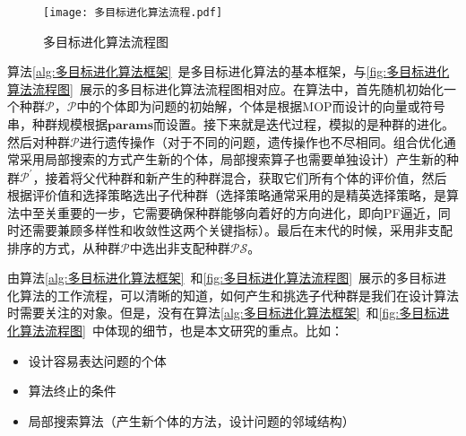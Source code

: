 \par
\begin{figure}[htb]
    \texttt{[image: 多目标进化算法流程.pdf]}
    \caption{多目标进化算法流程图}
    \label{fig:多目标进化算法流程图}
\end{figure}
\par
算法\ref{alg:多目标进化算法框架}~是多目标进化算法的基本框架，与\autoref{fig:多目标进化算法流程图}~展示的多目标进化算法流程图相对应。在算法中，首先随机初始化一个种群$\mathcal{P}$，$\mathcal{P}$中的个体即为问题的初始解，个体是根据MOP而设计的向量或符号串，种群规模根据$\mathbf{params}$而设置。接下来就是迭代过程，模拟的是种群的进化。然后对种群$\mathcal{P}$进行遗传操作（对于不同的问题，遗传操作也不尽相同。组合优化通常采用局部搜索的方式产生新的个体，局部搜索算子也需要单独设计）产生新的种群$\mathcal{P}^{'}$，接着将父代种群和新产生的种群混合，获取它们所有个体的评价值，然后根据评价值和选择策略选出子代种群（选择策略通常采用的是精英选择策略，是算法中至关重要的一步，它需要确保种群能够向着好的方向进化，即向PF逼近，同时还需要兼顾多样性和收敛性这两个关键指标）。最后在末代的时候，采用非支配排序的方式，从种群$\mathcal{P}$中选出非支配种群$\mathcal{PS}$。
\par
由算法\ref{alg:多目标进化算法框架}~和\autoref{fig:多目标进化算法流程图}~展示的多目标进化算法的工作流程，可以清晰的知道，如何产生和挑选子代种群是我们在设计算法时需要关注的对象。但是，没有在算法\ref{alg:多目标进化算法框架}~和\autoref{fig:多目标进化算法流程图}~中体现的细节，也是本文研究的重点。比如：
\begin{itemize}
    \item 设计容易表达问题的个体
    \item 算法终止的条件
    \item 局部搜索算法（产生新个体的方法，设计问题的邻域结构）
\end{itemize}

